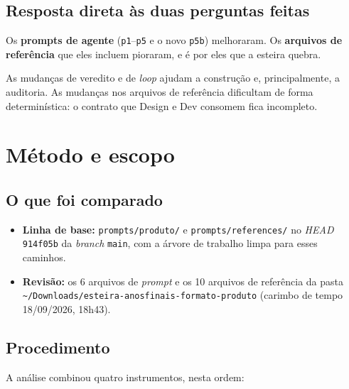 \documentclass[11pt,a4paper]{article}
\newcommand{\cod}[1]{\texttt{\small #1}}
\begin{document}
\subsection{Resposta direta às duas perguntas feitas}

\begin{description}[leftmargin=1.2cm,style=nextline]
  \item[Os prompts melhoraram ou pioraram?] Os \textbf{prompts de agente} (\cod{p1}--\cod{p5} e o novo
  \cod{p5b}) melhoraram. Os \textbf{arquivos de referência} que eles incluem pioraram, e é por eles que a
  esteira quebra.
  \item[Ajudam ou dificultam a construção da missão?] As mudanças de veredito e de \textit{loop} ajudam a
  construção e, principalmente, a auditoria. As mudanças nos arquivos de referência dificultam de forma
  determinística: o contrato que Design e Dev consomem fica incompleto.
\end{description}

\newpage
\section{Método e escopo}

\subsection{O que foi comparado}

\begin{itemize}[leftmargin=*]
  \item \textbf{Linha de base:} \texttt{prompts/produto/} e \texttt{prompts/references/} no \textit{HEAD}
  \cod{914f05b} da \textit{branch} \texttt{main}, com a árvore de trabalho limpa para esses caminhos.
  \item \textbf{Revisão:} os 6 arquivos de \textit{prompt} e os 10 arquivos de referência da pasta
  \texttt{\textasciitilde/Downloads/esteira-anosfinais-formato-produto} (carimbo de tempo 18/09/2026, 18h43).
\end{itemize}

\subsection{Procedimento}

A análise combinou quatro instrumentos, nesta ordem:
\end{document}
